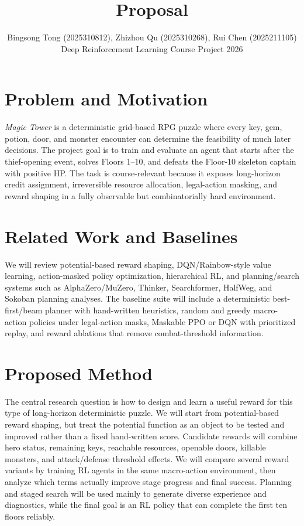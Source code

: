 \documentclass{article}
\title{Proposal}
\author{
Bingsong Tong (2025310812), Zhizhou Qu (2025310268), Rui Chen (2025211105)\\
Deep Reinforcement Learning Course Project 2026
}
\begin{document}
\maketitle

\section{Problem and Motivation}
\emph{Magic Tower} is a deterministic grid-based RPG puzzle where every key, gem, potion, door, and monster encounter can determine the feasibility of much later decisions. The project goal is to train and evaluate an agent that starts after the thief-opening event, solves Floors 1--10, and defeats the Floor-10 skeleton captain with positive HP. The task is course-relevant because it exposes long-horizon credit assignment, irreversible resource allocation, legal-action masking, and reward shaping in a fully observable but combinatorially hard environment.

\section{Related Work and Baselines}
We will review potential-based reward shaping, DQN/Rainbow-style value learning, action-masked policy optimization, hierarchical RL, and planning/search systems such as AlphaZero/MuZero, Thinker, Searchformer, HalfWeg, and Sokoban planning analyses. The baseline suite will include a deterministic best-first/beam planner with hand-written heuristics, random and greedy macro-action policies under legal-action masks, Maskable PPO or DQN with prioritized replay, and reward ablations that remove combat-threshold information.

\section{Proposed Method}
The central research question is how to design and learn a useful reward for this type of long-horizon deterministic puzzle. We will start from potential-based reward shaping, but treat the potential function as an object to be tested and improved rather than a fixed hand-written score. Candidate rewards will combine hero status, remaining keys, reachable resources, openable doors, killable monsters, and attack/defense threshold effects. We will compare several reward variants by training RL agents in the same macro-action environment, then analyze which terms actually improve stage progress and final success. Planning and staged search will be used mainly to generate diverse experience and diagnostics, while the final goal is an RL policy that can complete the first ten floors reliably.
\end{document}
